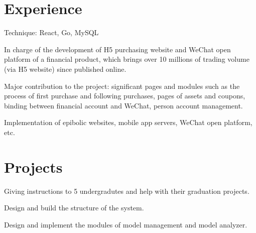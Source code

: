 \documentclass[]{resume_en}
\begin{document}
\hfill
\begin{minipage}[t]{0.66\textwidth} 


\section{Experience}
\vspace{\topsep}
\begin{tightemize}
\item Technique: React, Go, MySQL
\item In charge of the development of H5 purchasing website and WeChat open platform of a financial product, which brings over 10 millions of trading volume (via H5 website) since published online.
\item Major contribution to the project: significant pages and modules such as the process of first purchase and following purchases, pages of assets and coupons, binding between financial account and WeChat, person account management.
\end{tightemize}
\shortsectionsep

\begin{tightemize}
\item Implementation of epibolic websites, mobile app servers, WeChat open platform, etc.
\end{tightemize}


\section{Projects}
\begin{tightemize}
\item Giving instructions to 5 undergradutes and help with their graduation projects.
\item Design and build the structure of the system.
\item Design and implement the modules of model management and model analyzer.
\end{tightemize}
\shortsectionsep


\end{minipage}
\end{document}

